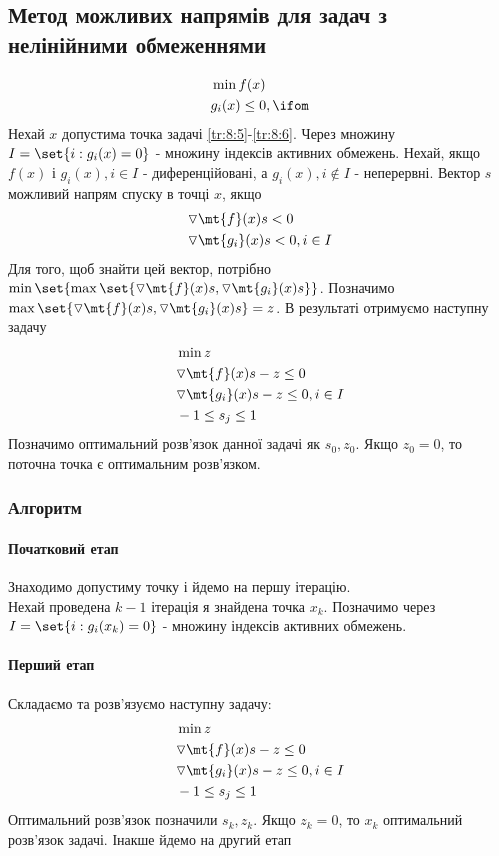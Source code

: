 \subsection{Метод можливих напрямів для задач з нелінійними обмеженнями}
\begin{eqnarray}
&\min f(x) \label{tr:8:5}\\
&g_i(x) \leq 0,\ifom\label{tr:8:6}
\end{eqnarray}
Нехай $x$ допустима точка задачі \eqref{tr:8:5}-\eqref{tr:8:6}. Через множину $I = \set{i:g_i(x)=0}$ - множину індексів активних обмежень. Нехай, якщо $f(x)$ і $g_i(x),i\in I$ - диференційовані, а $g_i(x),i\not\in I$ - неперервні. Вектор $s$ можливий напрям спуску в точці $x$, якщо 
\begin{eqnarray}
&\triangledown \mt{f}(x) s <0\\
&\triangledown \mt{g_i} (x) s <0,i\in I
\end{eqnarray}
Для того, щоб знайти цей вектор, потрібно $\min\set{\max\set{\triangledown \mt{f}(x)s,\triangledown \mt{g_i} (x) s}}$. Позначимо $\max\set{\triangledown \mt{f}(x)s,\triangledown \mt{g_i} (x) s} = z$. В результаті отримуємо наступну задачу
\begin{eqnarray}
&\min z\\
&\triangledown \mt{f}(x) s - z \leq 0\\
&\triangledown \mt{g_i}(x)s - z\leq 0,i\in I\\
&-1\leq s_j \leq 1
\end{eqnarray}
Позначимо оптимальний розв’язок данної задачі як $s_0,z_0$. Якщо $z_0=0$, то поточна точка є оптимальним розв’язком.
\subsubsection*{Алгоритм}
\paragraph{Початковий етап} Знаходимо допустиму точку і йдемо на першу ітерацію.\\
Нехай проведена $k-1$ ітерація я знайдена точка $x_k$. Позначимо через $I=\set{i:g_i(x_k)=0}$ - множину індексів активних обмежень. 
\paragraph{Перший етап} Складаємо та розв’язуємо наступну задачу:
\begin{eqnarray}
&\min z\\
&\triangledown \mt{f}(x) s - z \leq 0\\
&\triangledown \mt{g_i}(x)s - z\leq 0,i\in I\\
&-1\leq s_j \leq 1
\end{eqnarray}
Оптимальний розв’язок позначили $s_k,z_k$. Якщо $z_k=0$, то $x_k$ оптимальний розв’язок задачі. Інакше йдемо на другий етап
